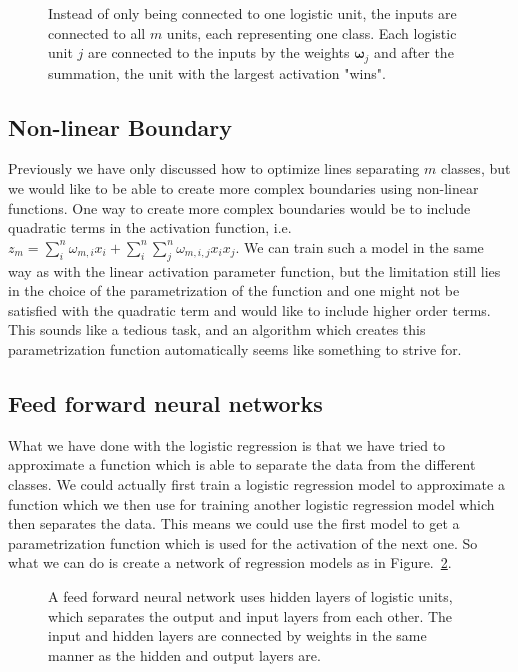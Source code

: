 \begin{figure}
    \centering
    
    \caption{\label{fig:multiple_logistic_units} Instead of only being connected to one logistic unit, the inputs are connected to all $m$ units, each representing one class. Each logistic unit $j$ are connected to the inputs by the weights $\bm{\omega}_j$ and after the summation, the unit with the largest activation "wins".}
\end{figure}

\subsection{Non-linear Boundary}

Previously we have only discussed how to optimize lines separating $m$ classes, but we would like to be able to create more complex boundaries using non-linear functions. One way to create more complex boundaries would be to include quadratic terms in the activation function, i.e. $z_m=\sum_i^n\omega_{m,i}x_i + \sum_i^n\sum_j^n\omega_{m,i,j}x_i x_j$. We can train such a model in the same way as with the linear activation parameter function, but the limitation still lies in the choice of the parametrization of the function and one might not be satisfied with the quadratic term and would like to include higher order terms. This sounds like a tedious task, and an algorithm which creates this parametrization function automatically seems like something to strive for.

\subsection{Feed forward neural networks}
\label{sec:ffnn}

What we have done with the logistic regression is that we have tried to approximate a function which is able to separate the data from the different classes. We could actually first train a logistic regression model to approximate a function which we then use for training another logistic regression model which then separates the data. This means we could use the first model to get a parametrization function which is used for the activation of the next one. So what we can do is create a network of regression models as in Figure.~\ref{fig:1hidden_neural_network}.

\begin{figure}
    \centering
    
    \caption{\label{fig:1hidden_neural_network} A feed forward neural network uses hidden layers of logistic units, which separates the output and input layers from each other. The input and hidden layers are connected by weights in the same manner as the hidden and output layers are.}
\end{figure}

